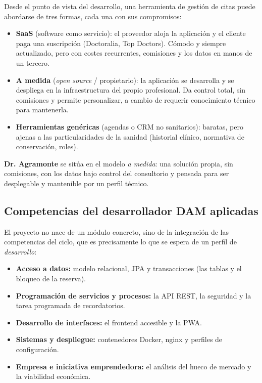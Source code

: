 \documentclass[12pt,a4paper]{report}
\begin{document}
Desde el punto de vista del desarrollo, una herramienta de gestión de citas puede abordarse de tres formas, cada una con sus compromisos:

\begin{itemize}
  \item \textbf{SaaS} (software como servicio): el proveedor aloja la aplicación y el cliente paga una suscripción (Doctoralia, Top Doctors). Cómodo y siempre actualizado, pero con costes recurrentes, comisiones y los datos en manos de un tercero.
  \item \textbf{A medida} (\emph{open source} / propietario): la aplicación se desarrolla y se despliega en la infraestructura del propio profesional. Da control total, sin comisiones y permite personalizar, a cambio de requerir conocimiento técnico para mantenerla.
  \item \textbf{Herramientas genéricas} (agendas o CRM no sanitarios): baratas, pero ajenas a las particularidades de la sanidad (historial clínico, normativa de conservación, roles).
\end{itemize}

\textbf{Dr. Agramonte} se sitúa en el modelo \emph{a medida}: una solución propia, sin comisiones, con los datos bajo control del consultorio y pensada para ser desplegable y mantenible por un perfil técnico.

\subsection{Competencias del desarrollador DAM aplicadas}

El proyecto no nace de un módulo concreto, sino de la integración de las competencias del ciclo, que es precisamente lo que se espera de un perfil de \emph{desarrollo}:

\begin{itemize}
  \item \textbf{Acceso a datos:} modelo relacional, JPA y transacciones (las tablas y el bloqueo de la reserva).
  \item \textbf{Programación de servicios y procesos:} la API REST, la seguridad y la tarea programada de recordatorios.
  \item \textbf{Desarrollo de interfaces:} el frontend accesible y la PWA.
  \item \textbf{Sistemas y despliegue:} contenedores Docker, nginx y perfiles de configuración.
  \item \textbf{Empresa e iniciativa emprendedora:} el análisis del hueco de mercado y la viabilidad económica.
\end{itemize}
\end{document}
